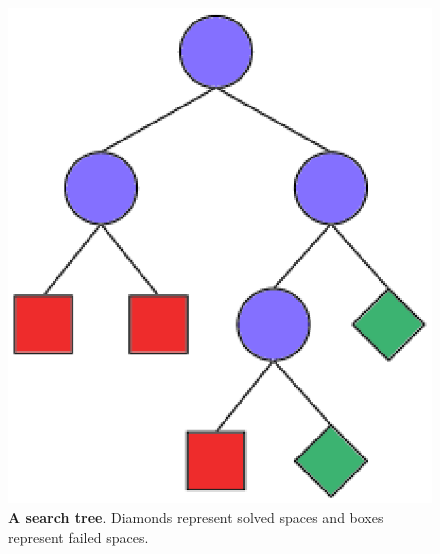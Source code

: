 \documentclass[a4paper]{scrartcl}
\begin{document}
\begin{figure}[htpb]

\centerline{\includegraphics*[scale=0.5]{figs/search-tree.eps}}
\caption{{\bf A search tree}. Diamonds represent solved spaces 
and boxes represent failed spaces.}
\label{figure2}
\end{figure}
\end{document}
